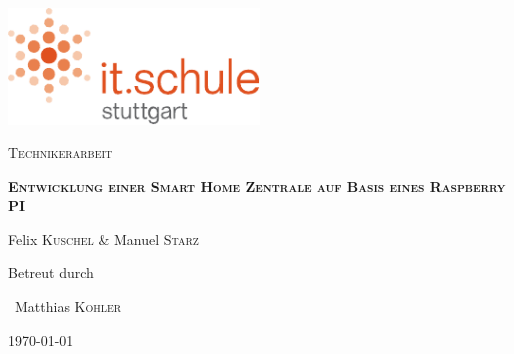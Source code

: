 \begin{titlepage}
	\centering
	\includegraphics[width=0.5\textwidth]{pdf/its_logo.pdf}\par\vspace{1cm}
	\vspace{1cm}
	{\scshape\Large Technikerarbeit\par}
	\vspace{1.5cm}
	{\huge\bfseries\scshape Entwicklung einer Smart Home Zentrale auf Basis eines Raspberry PI\par}
	\vspace{2cm}
	{\Large Felix \textsc{Kuschel} \& Manuel \textsc{Starz}\par}
	\vfill
	Betreut durch\par
	~Matthias \textsc{Kohler}

	\vfill

	{\large \today\par}
\end{titlepage}